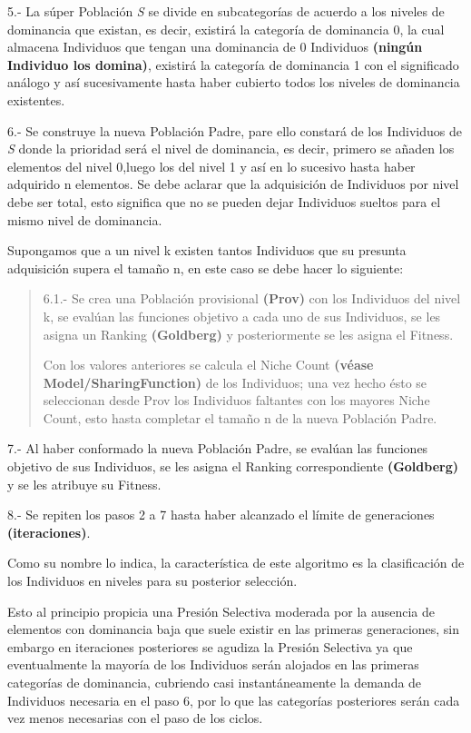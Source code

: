 \documentclass[letterpaper,10pt,english]{sphinxmanual}
\begin{document}
5.- La súper Población \emph{S} se divide en subcategorías de acuerdo a los niveles de dominancia que existan, es decir, existirá la categoría de dominancia 0, la cual almacena Individuos que tengan una dominancia de 0 Individuos \textbf{(ningún Individuo los domina)}, existirá la categoría de dominancia 1 con el significado análogo y así sucesivamente hasta haber cubierto todos los niveles de dominancia existentes.

6.- Se construye la nueva Población Padre, pare ello constará de los Individuos de \emph{S} donde la prioridad será el nivel de dominancia, es decir, primero se añaden los elementos del nivel 0,luego los del nivel 1 y así en lo sucesivo hasta haber adquirido n elementos.
Se debe aclarar que la adquisición de Individuos por nivel debe ser total, esto significa que no se pueden dejar Individuos sueltos para el mismo nivel de dominancia.

Supongamos que a un nivel k existen tantos Individuos que su presunta adquisición supera el tamaño n, en este caso se debe hacer lo siguiente:
\begin{quote}

6.1.- Se crea una Población provisional \textbf{(Prov)} con los Individuos del nivel k, se evalúan las funciones objetivo a cada uno de sus Individuos, se les asigna un Ranking \textbf{(Goldberg)} y posteriormente se les asigna el Fitness.

Con los valores anteriores se calcula el Niche Count \textbf{(véase Model/SharingFunction)} de los Individuos; una vez hecho ésto se seleccionan desde Prov los Individuos faltantes con los mayores Niche Count, esto hasta completar el tamaño n de la nueva Población Padre.
\end{quote}

7.- Al haber conformado la nueva Población Padre, se evalúan las funciones objetivo de sus Individuos, se les asigna el Ranking correspondiente \textbf{(Goldberg)} y se les atribuye su Fitness.

8.- Se repiten los pasos 2 a 7 hasta haber alcanzado el límite de generaciones \textbf{(iteraciones)}.

\begin{DUlineblock}{0em}
\item[] Como su nombre lo indica, la característica de este algoritmo es la clasificación
de los Individuos en niveles para su posterior selección.
\end{DUlineblock}

\begin{DUlineblock}{0em}
\item[] Esto al principio propicia una Presión Selectiva moderada por la ausencia de elementos
con dominancia baja que suele existir en las primeras generaciones, sin embargo en iteraciones
posteriores se agudiza la Presión Selectiva ya que eventualmente la mayoría de los Individuos
serán alojados en las primeras categorías de dominancia, cubriendo casi instantáneamente
la demanda de Individuos necesaria en el paso 6, por lo que las categorías posteriores serán
cada vez menos necesarias con el paso de los ciclos.
\end{DUlineblock}
\end{document}
